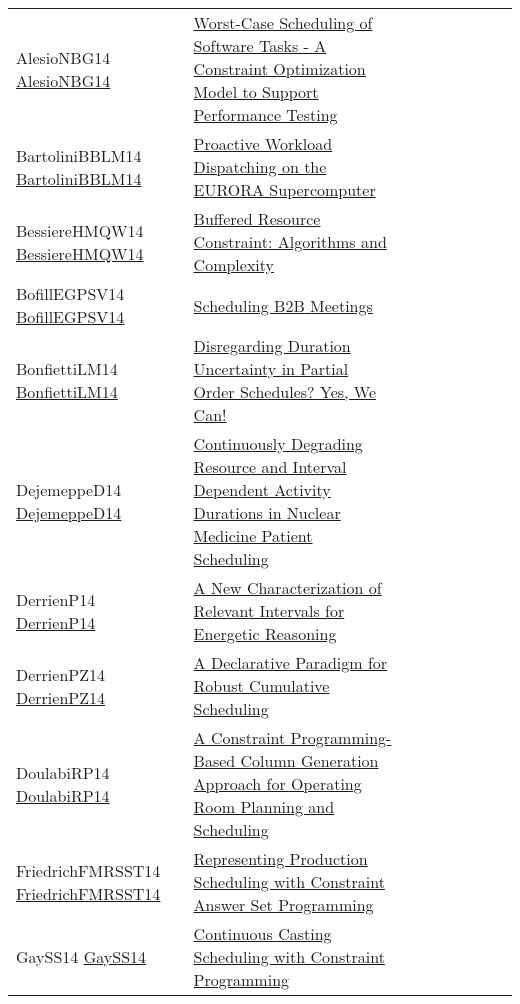 {\begin{longtable}{p{3cm}p{7cm}lllllll}
AlesioNBG14 \href{https://doi.org/10.1007/978-3-319-10428-7\_58}{AlesioNBG14} &  \href{papers/AlesioNBG14.pdf}{Worst-Case Scheduling of Software Tasks - {A} Constraint Optimization Model to Support Performance Testing} &  &  &  &  &  &  & \\
BartoliniBBLM14 \href{https://doi.org/10.1007/978-3-319-10428-7\_55}{BartoliniBBLM14} &  \href{papers/BartoliniBBLM14.pdf}{Proactive Workload Dispatching on the {EURORA} Supercomputer} &  &  &  &  &  &  & \\
BessiereHMQW14 \href{https://doi.org/10.1007/978-3-319-07046-9\_23}{BessiereHMQW14} &  \href{papers/BessiereHMQW14.pdf}{Buffered Resource Constraint: Algorithms and Complexity} &  &  &  &  &  &  & \\
BofillEGPSV14 \href{https://doi.org/10.1007/978-3-319-10428-7\_56}{BofillEGPSV14} &  \href{papers/BofillEGPSV14.pdf}{Scheduling {B2B} Meetings} &  &  &  &  &  &  & \\
BonfiettiLM14 \href{https://doi.org/10.1007/978-3-319-07046-9\_15}{BonfiettiLM14} &  \href{papers/BonfiettiLM14.pdf}{Disregarding Duration Uncertainty in Partial Order Schedules? Yes, We Can!} &  &  &  &  &  &  & \\
DejemeppeD14 \href{https://doi.org/10.1007/978-3-319-07046-9\_20}{DejemeppeD14} &  \href{papers/DejemeppeD14.pdf}{Continuously Degrading Resource and Interval Dependent Activity Durations in Nuclear Medicine Patient Scheduling} &  &  &  &  &  &  & \\
DerrienP14 \href{https://doi.org/10.1007/978-3-319-10428-7\_22}{DerrienP14} &  \href{papers/DerrienP14.pdf}{A New Characterization of Relevant Intervals for Energetic Reasoning} &  &  &  &  &  &  & \\
DerrienPZ14 \href{https://doi.org/10.1007/978-3-319-10428-7\_23}{DerrienPZ14} &  \href{papers/DerrienPZ14.pdf}{A Declarative Paradigm for Robust Cumulative Scheduling} &  &  &  &  &  &  & \\
DoulabiRP14 \href{https://doi.org/10.1007/978-3-319-07046-9\_32}{DoulabiRP14} &  \href{papers/DoulabiRP14.pdf}{A Constraint Programming-Based Column Generation Approach for Operating Room Planning and Scheduling} &  &  &  &  &  &  & \\
FriedrichFMRSST14 \href{https://doi.org/10.1007/978-3-319-28697-6\_23}{FriedrichFMRSST14} &  \href{papers/FriedrichFMRSST14.pdf}{Representing Production Scheduling with Constraint Answer Set Programming} &  &  &  &  &  &  & \\
GaySS14 \href{https://doi.org/10.1007/978-3-319-10428-7\_59}{GaySS14} &  \href{papers/GaySS14.pdf}{Continuous Casting Scheduling with Constraint Programming} &  &  &  &  &  &  & \\

\end{longtable}}

